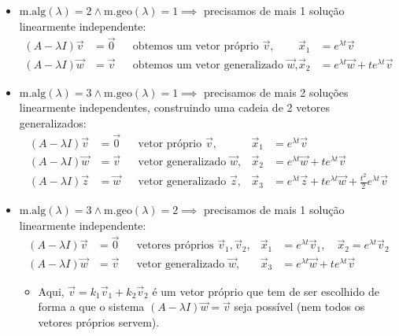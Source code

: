 \documentclass{article}
\begin{document}
\begin{itemize}
    \item $\text{m.alg}(\lambda) = 2 \land \text{m.geo}(\lambda) = 1 \implies$ precisamos de
    mais 1 solução linearmente independente:
    \begin{align*}
    (A - \lambda I)\vec{v} &= \vec{0} & & \text{obtemos um vetor próprio } \vec{v}, &
    \vec{x}_1 &= e^{\lambda t}\vec{v} \\
    (A - \lambda I)\vec{w} &= \vec{v} & & \text{obtemos um vetor generalizado } \vec{w}, &
    \vec{x}_2 &= e^{\lambda t}\vec{w} + t e^{\lambda t}\vec{v}
    \end{align*}

    \item $\text{m.alg}(\lambda) = 3 \land \text{m.geo}(\lambda) = 1 \implies$ precisamos de
    mais 2 soluções linearmente independentes, construindo uma cadeia de 2 vetores generalizados:
    \begin{align*}
    (A - \lambda I)\vec{v} &= \vec{0} & & \text{vetor próprio } \vec{v}, &
    \vec{x}_1 &= e^{\lambda t}\vec{v} \\
    (A - \lambda I)\vec{w} &= \vec{v} & & \text{vetor generalizado } \vec{w}, &
    \vec{x}_2 &= e^{\lambda t}\vec{w} + t e^{\lambda t}\vec{v} \\
    (A - \lambda I)\vec{z} &= \vec{w} & & \text{vetor generalizado } \vec{z}, &
    \vec{x}_3 &= e^{\lambda t}\vec{z} + t e^{\lambda t}\vec{w} + \frac{t^2}{2} e^{\lambda t}\vec{v}
    \end{align*}

    \item $\text{m.alg}(\lambda) = 3 \land \text{m.geo}(\lambda) = 2 \implies$ precisamos de
    mais 1 solução linearmente independente:
    \begin{align*}
    (A - \lambda I)\vec{v} &= \vec{0} & & \text{vetores próprios } \vec{v}_1, \vec{v}_2, &
    \vec{x}_1 &= e^{\lambda t}\vec{v}_1, \quad \vec{x}_2 = e^{\lambda t}\vec{v}_2 \\
    (A - \lambda I)\vec{w} &= \vec{v} & & \text{vetor generalizado } \vec{w}, &
    \vec{x}_3 &= e^{\lambda t}\vec{w} + t e^{\lambda t}\vec{v}
    \end{align*}
    \begin{itemize}
        \item Aqui, $\vec{v} = k_1 \vec{v}_1 + k_2 \vec{v}_2$ é um vetor próprio que tem de ser escolhido de
        forma a que o sistema $(A - \lambda I)\vec{w} = \vec{v}$ seja possível (nem todos os vetores
        próprios servem).
    \end{itemize}
\end{itemize}
\end{document}
